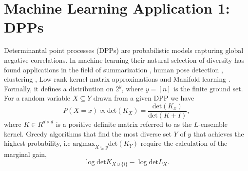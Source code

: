 \documentclass[letterpaper]{article} %
\begin{document}
\section{Machine Learning Application 1: DPPs}
Determinantal point processes (DPPs) \cite{macchi1975coincidence} are probabilistic models capturing global negative correlations. %
In machine learning their natural selection of diversity has found applications in the field of summarization \cite{gong2014diverse}, human pose detection \cite{kulesza_2012}, clustering \cite{kang2013fast}, Low rank kernel matrix approximations \cite{li2016fast} and Manifold learning \cite{wachinger2015sampling}. Formally, it defines a distribution on $2^{y}$, where $y = [n]$ is the finite ground set. For a random variable $X \subseteq Y$ drawn from a given DPP we have
\begin{equation}
P(X = x) \propto \mathrm{det}(K_{X}) = \frac{\mathrm{det}(K_{x})}{\mathrm{det}(K+I)},
\end{equation}
where $K \in 
{R}^{d\times d}$ is a positive definite matrix referred to as the $L$-ensemble kernel. Greedy algorithms that find the most diverse set $Y$ of $y$ that achieves the highest probability, i.e $\mathrm{argmax}_{X\subseteq y} \mathrm{det}(K_{Y})$ require the calculation of the marginal gain, 
\begin{equation}
\log \mathrm{det} K_{X\cup\{i\}} - \log \mathrm{det} L_{X}.
\end{equation}
{\color{red}{ADD DPP EXPERIMENT HERE}}





\end{document}
